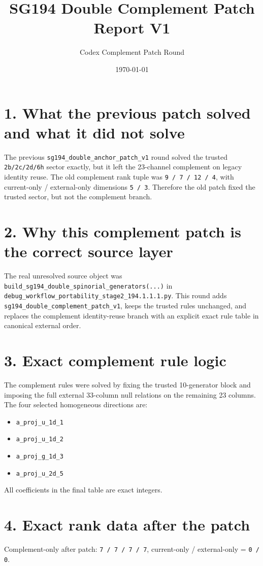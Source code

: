 \documentclass[11pt]{article}
\title{SG194 Double Complement Patch Report V1}
\author{Codex Complement Patch Round}
\date{\today}
\begin{document}
\maketitle

\section*{1. What the previous patch solved and what it did not solve}
The previous \texttt{sg194\_double\_anchor\_patch\_v1} round solved the trusted \texttt{2b/2c/2d/6h} sector exactly, but it left the 23-channel complement on legacy identity reuse. The old complement rank tuple was \texttt{9 / 7 / 12 / 4}, with current-only / external-only dimensions \texttt{5 / 3}. Therefore the old patch fixed the trusted sector, but not the complement branch.

\section*{2. Why this complement patch is the correct source layer}
The real unresolved source object was \texttt{build\_sg194\_double\_spinorial\_generators(...)} in \texttt{debug\_workflow\_portability\_stage2\_194.1.1.1.py}. This round adds \texttt{sg194\_double\_complement\_patch\_v1}, keeps the trusted rules unchanged, and replaces the complement identity-reuse branch with an explicit exact rule table in canonical external order.

\section*{3. Exact complement rule logic}
The complement rules were solved by fixing the trusted 10-generator block and imposing the full external 33-column null relations on the remaining 23 columns. The four selected homogeneous directions are:
\begin{itemize}
\item \texttt{a\_proj\_u\_1d\_1}
\item \texttt{a\_proj\_u\_1d\_2}
\item \texttt{a\_proj\_g\_1d\_3}
\item \texttt{a\_proj\_u\_2d\_5}
\end{itemize}
All coefficients in the final table are exact integers.

\section*{4. Exact rank data after the patch}
Complement-only after patch: \texttt{7 / 7 / 7 / 7}, current-only / external-only = \texttt{0 / 0}.
\end{document}

